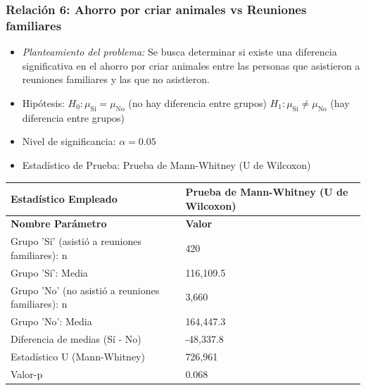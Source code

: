 \documentclass[12pt,a4paper]{article}
\begin{document}
\subsubsection*{Relación 6: Ahorro por criar animales vs Reuniones familiares}

\begin{itemize}
    \item \textit{Planteamiento del problema:} Se busca determinar si existe una diferencia significativa en el ahorro por criar animales entre las personas que asistieron a reuniones familiares y las que no asistieron.
    \item Hipótesis: \quad $H_0: \mu_{\text{Sí}} = \mu_{\text{No}}$ (no hay diferencia entre grupos) \hspace{1cm} $H_1: \mu_{\text{Sí}} \neq \mu_{\text{No}}$ (hay diferencia entre grupos)
    \item Nivel de significancia: $\alpha = 0.05$
    \item Estadístico de Prueba: Prueba de Mann-Whitney (U de Wilcoxon)
\end{itemize}

\begin{tabular}{|m{7cm}|m{7cm}|}
\hline
\textbf{Estadístico Empleado} & Prueba de Mann-Whitney (U de Wilcoxon) \\ \hline
\textbf{Nombre Parámetro} & \textbf{Valor} \\ \hline
Grupo 'Sí' (asistió a reuniones familiares): n & 420 \\ \hline
Grupo 'Sí': Media & 116,109.5 \\ \hline
Grupo 'No' (no asistió a reuniones familiares): n & 3,660 \\ \hline
Grupo 'No': Media & 164,447.3 \\ \hline
Diferencia de medias (Sí - No) & -48,337.8 \\ \hline
Estadístico U (Mann-Whitney) & 726,961 \\ \hline
Valor-p & 0.068 \\ \hline
\end{tabular}
\end{document}
